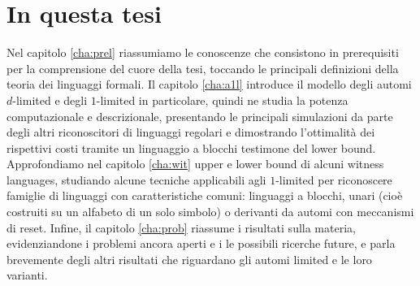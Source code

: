 \section*{In questa tesi}
Nel capitolo \ref{cha:prel} riassumiamo le conoscenze che consistono in prerequisiti per la comprensione del cuore della tesi, toccando le principali definizioni della teoria dei linguaggi formali. Il capitolo \ref{cha:a1l} introduce il modello degli automi $d$-limited e degli $1$-limited in particolare, quindi ne studia la potenza computazionale e descrizionale, presentando le principali simulazioni da parte degli altri riconoscitori di linguaggi regolari e dimostrando l'ottimalità dei rispettivi costi tramite un linguaggio a blocchi testimone del lower bound. Approfondiamo nel capitolo \ref{cha:wit} upper e lower bound di alcuni witness languages, studiando alcune tecniche applicabili agli $1$-limited per riconoscere famiglie di linguaggi con caratteristiche comuni: linguaggi a blocchi, unari (cioè costruiti su un alfabeto di un solo simbolo) o derivanti da automi con meccanismi di reset. Infine, il capitolo \ref{cha:prob} riassume i risultati sulla materia, evidenziandone i problemi ancora aperti e i le possibili ricerche future, e parla brevemente degli altri risultati che riguardano gli automi limited e le loro varianti.
